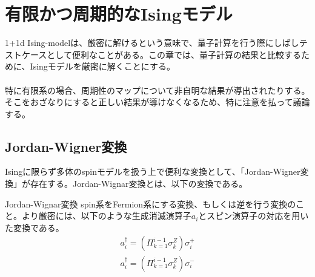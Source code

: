 \documentclass[a4paper,10.5pt]{article}
\numberwithin{equation}{section}
\begin{document}
\section{有限かつ周期的なIsingモデル}
1+1d Ising-modelは、厳密に解けるという意味で、量子計算を行う際にしばしテストケースとして便利なことがある。この章では、量子計算の結果と比較するために、Isingモデルを厳密に解くことにする。\\
\\
特に有限系の場合、周期性のマップについて非自明な結果が導出されたりする。そこをおざなりにすると正しい結果が導けなくなるため、特に注意を払って議論する。
\subsection{Jordan-Wigner変換}
Isingに限らず多体のspinモデルを扱う上で便利な変換として、「Jordan-Wigner変換」が存在する。Jordan-Wignar変換とは、以下の変換である。
\begin{defbox}{Jordan-Wignar変換}
spin系をFermion系にする変換、もしくは逆を行う変換のこと。より厳密には、以下のような生成消滅演算子$a_{i}$とスピン演算子の対応を用いた変換である。
\begin{equation}\begin{split} \label{Jordan}
    a_{i}^{\dagger} = (\Pi_{k=1}^{i-1} \sigma_{k}^{Z} ) \sigma_{i}^{+}\\
    a_{i}^{\dagger} = (\Pi_{k=1}^{i-1} \sigma_{k}^{Z} ) \sigma_{i}^{-}
\end{split} \end{equation}
\end{defbox}
\end{document}
